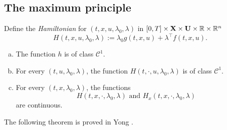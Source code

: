 \subsection{The maximum principle}


Define the {\it Hamiltonian} for $(t,x,u,\lambda_0,\lambda)$ in $[0,T]\times \mathbf{X}\times \mathbf{U}\times\mathbb{R}\times\mathbb{R}^n$
    \[H(t,x,u,\lambda_0,\lambda):= \lambda_0g(t,x,u) + \lambda^\top f(t,x,u).  \]  
    

\begin{assumption}\rm  %
\begin{enumerate}[(a)]
    \item The function $h$ is of class $\mathcal{C}^1$.
    \item For every $(t,u,\lambda_0,\lambda)$, the function $H(t,\cdot,u,\lambda_0,\lambda)$ is of class $\mathcal{C}^1$.
    \item For every $(t,x,\lambda_0,\lambda)$, the functions
     \[ H(t,x,\cdot,\lambda_0,\lambda) \mbox{ and }   H_x(t,x,\cdot,\lambda_0,\lambda)  \]
are continuous.
\end{enumerate}
\end{assumption}


The following theorem is proved in Yong \cite[Theorem 2.3.1]{Yong2015}.

